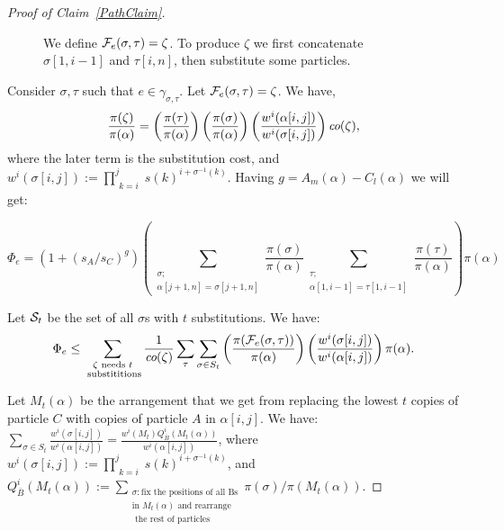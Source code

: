 \documentclass[10 pt]{article}
\begin{document}
\begin{proof}[Proof of Claim~\ref{PathClaim}]
\begin{figure}[!ht]

\centerline{}

\caption{We define ${\cal F}_{e}(\sigma, \tau)=\zeta$. To produce $\zeta$ we first concatenate $\sigma[1,i-1]$ and $\tau[i,n]$, then
substitute some particles.}\label{Move2fig}
\end{figure}



Consider $\sigma, \tau$ such that $e\in \gamma_{\sigma,\tau}$. Let ${\cal F}_e(\sigma,\tau)=\zeta$. We have, 
$$\frac{\pi(\zeta)}{\pi(\alpha)}= \left(\frac{\pi(\tau)}{\pi(\alpha)}\right)\left(\frac{\pi(\sigma)}{\pi(\alpha)}\right)
\left(\frac{w^i(\alpha[i,j])}{w^i(\sigma[i,j])}\right)
\emph{co}(\zeta),
$$
where the later term is the substitution cost, and $w^i(\sigma[i,j]):= \prod_{\substack{k=i}}^{j} s(k)^{i+\sigma^{-1}(k)}$.
Having $g=A_m(\alpha)-C_l(\alpha)$ we will get:

$$
\Phi_{e}= \left(1+(s_{A}/s_{C})^g\right)\left( \displaystyle\sum_{\substack{\sigma;\\ \alpha[j{+}1,n]=\sigma[j{+}1,n]}} \frac{\pi(\sigma)}{\pi(\alpha)} \sum_{\substack{\tau;\\ \alpha[1,i{-}1]=\tau[1,i{-}1]}} \frac{\pi(\tau)}{\pi(\alpha)} \right)\pi(\alpha)
$$



Let ${\cal S}_t$  be the set of all $\sigma$s with $t$ substitutions. We  have:
\begin{equation}\label{eq3}
\Phi_{e}\leq \sum_{\substack{\zeta \text{ needs }t \\\text{ substititions}}} \frac{1}{\emph{co}(\zeta)} \displaystyle \sum_{\tau}\sum_{\sigma\in S_t}\left( \frac{\pi({\cal F}_e(\sigma,\tau))}{\pi(\alpha)}\right)
\left( \frac{w^i(\sigma[i,j])}{w^i(\alpha[i,j])}\right){\pi(\alpha)}.
\end{equation}

Let $M_t(\alpha)$  be the  arrangement that we get from replacing the lowest $t$ copies of particle $C$ with copies of particle $A$
in  $\alpha[i,j]$. We have:
$
\sum_{\sigma\in S_t} \frac{w^i(\sigma[i,j])}{w^i(\alpha[i,j])}= \frac{w^i(M_t)Q^i_{\bar{B}}(M_t(\alpha))}{w^i(\alpha[i,j])}
$, where $w^i(\sigma[i,j]):= \prod_{\substack{k=i}}^{j} s(k)^{i+\sigma^{-1}(k)}$, and 
$Q^i_{\bar{B}}(M_t(\alpha))
:=\sum_{\substack{\sigma: \text{fix the positions of all Bs}\\ \text{in $M_t(\alpha)$ and rearrange}\\ \text{ the rest of particles }
}} \pi(\sigma)  /\pi(M_t(\alpha)).
$


\end{proof}
\end{document}
